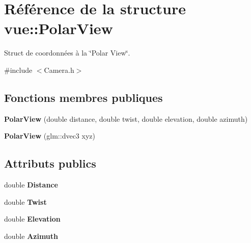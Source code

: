\hypertarget{structvue_1_1_polar_view}{\section{Référence de la structure vue\-:\-:Polar\-View}
\label{structvue_1_1_polar_view}
}


Struct de coordonnées à la \char`\"{}\-Polar View\char`\"{}.  




{\ttfamily \#include $<$Camera.\-h$>$}

\subsection*{Fonctions membres publiques}
\begin{DoxyCompactItemize}
\item 
\hypertarget{structvue_1_1_polar_view_a3392b42de02e12b36182dc2ee28ffa53}{{\bfseries Polar\-View} (double distance, double twist, double elevation, double azimuth)}\label{structvue_1_1_polar_view_a3392b42de02e12b36182dc2ee28ffa53}

\item 
\hypertarget{structvue_1_1_polar_view_a0c2e60b3ec1eed8a1e8e10188e3a976f}{{\bfseries Polar\-View} (glm\-::dvec3 xyz)}\label{structvue_1_1_polar_view_a0c2e60b3ec1eed8a1e8e10188e3a976f}

\end{DoxyCompactItemize}
\subsection*{Attributs publics}
\begin{DoxyCompactItemize}
\item 
\hypertarget{structvue_1_1_polar_view_a869bc2b90a3f2f284089309dadbce7ad}{double {\bfseries Distance}}\label{structvue_1_1_polar_view_a869bc2b90a3f2f284089309dadbce7ad}

\item 
\hypertarget{structvue_1_1_polar_view_a0a2996c56b0125f6ed687295780df20a}{double {\bfseries Twist}}\label{structvue_1_1_polar_view_a0a2996c56b0125f6ed687295780df20a}

\item 
\hypertarget{structvue_1_1_polar_view_ab1751f775b21dc4adedf468e0f697bf8}{double {\bfseries Elevation}}\label{structvue_1_1_polar_view_ab1751f775b21dc4adedf468e0f697bf8}

\item 
\hypertarget{structvue_1_1_polar_view_a47356a3d304accc7a3c2713da9280016}{double {\bfseries Azimuth}}\label{structvue_1_1_polar_view_a47356a3d304accc7a3c2713da9280016}

\end{DoxyCompactItemize}


